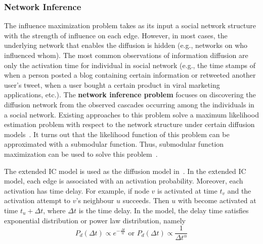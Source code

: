 \subsubsection{Network Inference}
The influence maximization problem takes as its input a social network structure with the strength of influence on each edge. However, in most cases, the underlying network that enables the diffusion is hidden (e.g., networks on who influenced whom). The most common observations of information diffusion are only the activation time for individual in social network (e.g., the time stamps of when a person posted a blog containing certain information or retweeted another user's tweet, when a user bought a certain product in viral marketing applications, etc.). The \textbf{network inference problem} focuses on discovering the diffusion network from the observed cascades occurring among the individuals in a social network. Existing approaches to this problem solve a maximum likelihood estimation problem with respect to the network structure under certain diffusion models~\cite{GJA10,GB12,GDB11,SJ10}. It turns out that the likelihood function of this problem can be approximated with a submodular function. Thus, submodular function maximization can be used to solve this problem~\cite{GJA10,GB12}.

The extended IC model is used as the diffusion model in~\cite{GJA10,GB12}. In the extended IC model, each edge is associated with an activation probability. Moreover, each activation has time delay. For example, if node $v$ is activated at time $t_v$ and the activation attempt to $v$'s neighbour $u$ succeeds. Then $u$ with become activated at time $t_u+\Delta t$, where $\Delta t$ is the time delay. In the model, the delay time satisfies exponential distribution or power law distribution, namely
$$
P_d(\Delta t)\propto e^{-\frac{\Delta t}{\alpha}} \text{\ or\ } P_d(\Delta t)\propto\frac{1}{\Delta t^\alpha}
$$

